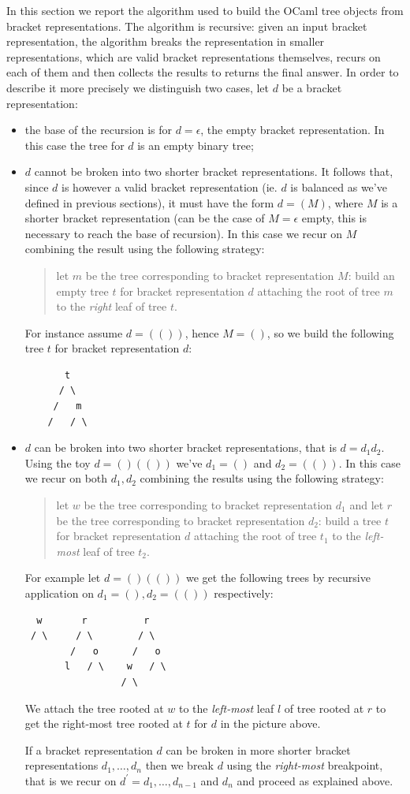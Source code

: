 In this section we report the algorithm used to build the OCaml tree
objects from bracket representations. The algorithm is recursive:
given an input bracket representation, the algorithm breaks the
representation in smaller representations, which are valid bracket
representations themselves, recurs on each of them and then collects
the results to returns the final answer. In order to describe it more
precisely we distinguish two cases, let $d$ be a bracket
representation:
\begin{itemize}
\item the base of the recursion is for $d=\epsilon$, the empty bracket
  representation. In this case the tree for $d$ is an empty binary
  tree;
\item $d$ cannot be broken into two shorter bracket
  representations. It follows that, since $d$ is however a valid
  bracket representation (ie. $d$ is balanced as we've defined in
  previous sections), it must have the form $d = (M)$, where $M$ is a
  shorter bracket representation (can be the case of $M = \epsilon$
  empty, this is necessary to reach the base of recursion). In this
  case we recur on $M$ combining the result using the following
  strategy:
  \begin{quote}
    let $m$ be the tree corresponding to bracket representation $M$:
    build an empty tree $t$ for bracket representation $d$ attaching
    the root of tree $m$ to the \emph{right} leaf of tree $t$.
  \end{quote}
  For instance assume $d = (())$, hence $M=()$, so we build the
  following tree $t$ for bracket representation $d$:
\begin{verbatim}
       t
      / \
     /   m
    /   / \
\end{verbatim}
\item $d$ can be broken into two shorter bracket representations, that
  is $d = d_1d_2$. Using the toy $d=()(())$ we've $d_1=()$ and
  $d_2=(())$. In this case we recur on both $d_1,d_2$ combining the
  results using the following strategy:
  \begin{quote}
    let $w$ be the tree corresponding to bracket representation $d_1$
    and let $r$ be the tree corresponding to bracket representation
    $d_2$: build a tree $t$ for bracket representation $d$ attaching
    the root of tree $t_1$ to the \emph{left-most} leaf of tree $t_2$.
  \end{quote}
  For example let $d=()(())$ we get the following trees by recursive
  application on $d_1=(),d_2 =(())$ respectively:
\begin{verbatim}
  w       r          r
 / \     / \        / \
        /   o      /   o
       l   / \    w   / \
                 / \
\end{verbatim}
  We attach the tree rooted at $w$ to the \emph{left-most} leaf $l$ of
  tree rooted at $r$ to get the right-most tree rooted at $t$ for $d$
  in the picture above.

  If a bracket representation $d$ can be broken in more shorter
  bracket representations $d_1,\ldots,d_n$ then we break $d$ using the
  \emph{right-most} breakpoint, that is we recur on $d^{\prime} =
  d_1,\ldots,d_{n-1}$ and $d_n$ and proceed as explained above.
\end{itemize}

